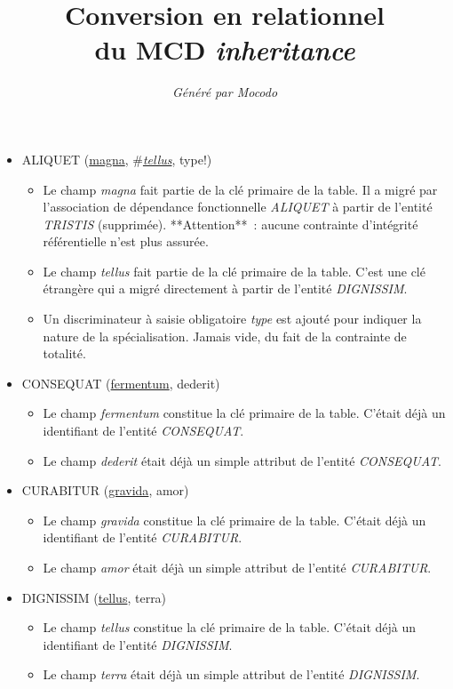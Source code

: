 \documentclass[a4paper]{article}
\title{Conversion en relationnel\\du MCD \emph{inheritance}}
\author{\emph{Généré par Mocodo}}
\newcommand{\relat}[1]{\textsc{#1}}
\newcommand{\attr}[1]{#1}
\newcommand{\prim}[1]{\uline{#1}}
\newcommand{\foreign}[1]{\#\textsl{#1}}
\begin{document}
\maketitle

\begin{itemize}
  \item \relat{ALIQUET} (\prim{magna}, \foreign{\prim{tellus}}, \attr{type!})
  \begin{itemize}
    \item Le champ \emph{magna} fait partie de la clé primaire de la table. Il a migré par l'association de dépendance fonctionnelle \emph{ALIQUET} à partir de l'entité \emph{TRISTIS} (supprimée). **Attention** : aucune contrainte d'intégrité référentielle n'est plus assurée.
    \item Le champ \emph{tellus} fait partie de la clé primaire de la table. C'est une clé étrangère qui a migré directement à partir de l'entité \emph{DIGNISSIM}.
    \item Un discriminateur à saisie obligatoire \emph{type} est ajouté pour indiquer la nature de la spécialisation. Jamais vide, du fait de la contrainte de totalité.
  \end{itemize}

  \item \relat{CONSEQUAT} (\prim{fermentum}, \attr{dederit})
  \begin{itemize}
    \item Le champ \emph{fermentum} constitue la clé primaire de la table. C'était déjà un identifiant de l'entité \emph{CONSEQUAT}.
    \item Le champ \emph{dederit} était déjà un simple attribut de l'entité \emph{CONSEQUAT}.
  \end{itemize}

  \item \relat{CURABITUR} (\prim{gravida}, \attr{amor})
  \begin{itemize}
    \item Le champ \emph{gravida} constitue la clé primaire de la table. C'était déjà un identifiant de l'entité \emph{CURABITUR}.
    \item Le champ \emph{amor} était déjà un simple attribut de l'entité \emph{CURABITUR}.
  \end{itemize}

  \item \relat{DIGNISSIM} (\prim{tellus}, \attr{terra})
  \begin{itemize}
    \item Le champ \emph{tellus} constitue la clé primaire de la table. C'était déjà un identifiant de l'entité \emph{DIGNISSIM}.
    \item Le champ \emph{terra} était déjà un simple attribut de l'entité \emph{DIGNISSIM}.
  \end{itemize}


\end{itemize}
\end{document}
